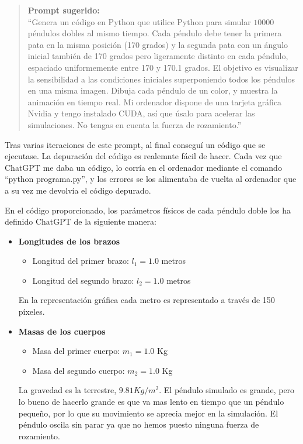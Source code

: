 \documentclass[
  10pt,
  a4paper,
  DIV=11,
  numbers=noendperiod,
  open=any]{scrreprt}
\providecommand{\tightlist}{%
  \setlength{\itemsep}{0pt}\setlength{\parskip}{0pt}}
\numberwithin{equation}{chapter}
\numberwithin{equation}{chapter}
\renewcommand{\[}{\begin{equation}}
\renewcommand{\]}{\end{equation}}
\begin{document}
\begin{quote}
\textbf{Prompt sugerido:}\\
``Genera un código en Python que utilice Python para simular \(10000\)
péndulos dobles al mismo tiempo. Cada péndulo debe tener la primera pata
en la misma posición (170 grados) y la segunda pata con un ángulo
inicial también de 170 grados pero ligeramente distinto en cada péndulo,
espaciado uniformemente entre 170 y 170.1 grados. El objetivo es
visualizar la sensibilidad a las condiciones iniciales superponiendo
todos los péndulos en una misma imagen. Dibuja cada péndulo de un color,
y muestra la animación en tiempo real. Mi ordenador dispone de una
tarjeta gráfica Nvidia y tengo instalado CUDA, así que úsalo para
acelerar las simulaciones. No tengas en cuenta la fuerza de
rozamiento.''
\end{quote}

Tras varias iteraciones de este prompt, al final conseguí un código que
se ejecutase. La depuración del código es realemnte fácil de hacer. Cada
vez que ChatGPT me daba un código, lo corría en el ordenador mediante el
comando ``python programa.py'', y los errores se los alimentaba de
vuelta al ordenador que a su vez me devolvía el código depurado.

En el código proporcionado, los parámetros físicos de cada péndulo doble
los ha definido ChatGPT de la siguiente manera:

\begin{itemize}
\item
  \textbf{Longitudes de los brazos}

  \begin{itemize}
  \tightlist
  \item
    Longitud del primer brazo: \(l_1 = 1.0\) metros\\
  \item
    Longitud del segundo brazo: \(l_2 = 1.0\) metros
  \end{itemize}

  En la representación gráfica cada metro es representado a través de
  150 píxeles.
\item
  \textbf{Masas de los cuerpos}

  \begin{itemize}
  \tightlist
  \item
    Masa del primer cuerpo: \(m_1 = 1.0\) Kg
  \item
    Masa del segundo cuerpo: \(m_2 = 1.0\) Kg
  \end{itemize}

  La gravedad es la terrestre, \(9.81 Kg/m^2\). El péndulo simulado es
  grande, pero lo bueno de hacerlo grande es que va mas lento en tiempo
  que un péndulo pequeño, por lo que su movimiento se aprecia mejor en
  la simulación. El péndulo oscila sin parar ya que no hemos puesto
  ninguna fuerza de rozamiento.
\end{itemize}
\end{document}
